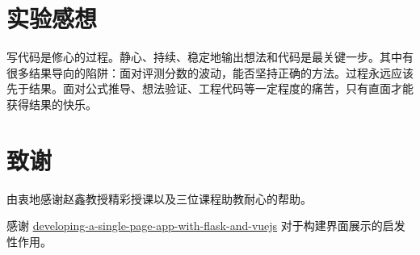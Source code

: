\documentclass{ctexart}
\begin{document}
\section{实验感想}

写代码是修心的过程。静心、持续、稳定地输出想法和代码是最关键一步。其中有很多结果导向的陷阱：面对评测分数的波动，能否坚持正确的方法。过程永远应该先于结果。面对公式推导、想法验证、工程代码等一定程度的痛苦，只有直面才能获得结果的快乐。


\section{致谢}

由衷地感谢赵鑫教授精彩授课以及三位课程助教耐心的帮助。

感谢 \href{https://github.com/xitu/gold-miner/blob/master/TODO1/developing-a-single-page-app-with-flask-and-vuejs.md}{developing-a-single-page-app-with-flask-and-vuejs} 对于构建界面展示的启发性作用。
\end{document}
